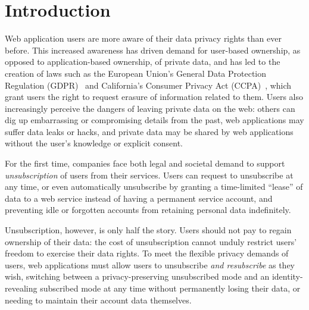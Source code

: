 \section{Introduction}

Web application users are more aware of their data privacy rights than ever before. 
%
This increased awareness has driven demand for user-based ownership, as opposed to application-based
ownership, of private data, and has led to the creation of laws such as the European Union's General
Data Protection Regulation (GDPR)~\cite{eu:gdpr} and California's Consumer Privacy Act
(CCPA)~\cite{ca:privacy-act}, which grant users the right to request erasure of information related
to them.
%
Users also increasingly perceive the dangers of leaving private data on the
web: others can dig up embarrassing or compromising details from the past, web applications may
suffer data leaks or hacks, and private data may be shared by web applications without the user's
knowledge or explicit consent.
%

%
For the first time, companies face both legal and societal demand to support \emph{unsubscription}
of users from their services. Users can request to unsubscribe at any time, or even 
automatically unsubscribe by granting a time-limited
``lease'' of data to a web service instead of having a permanent service account, and preventing
idle or forgotten accounts from retaining personal data indefinitely.
%

%
Unsubscription, however, is only half the story. Users should not pay to regain ownership of their
data: the cost of unsubscription cannot unduly restrict users' freedom to exercise their data
rights. To meet the flexible privacy demands of users, web applications must allow users to
unsubscribe \emph{and resubscribe} as they wish, switching between a privacy-preserving unsubscribed
mode and an identity-revealing subscribed mode at any time without permanently losing their data, or
needing to maintain their account data themselves. 
%


